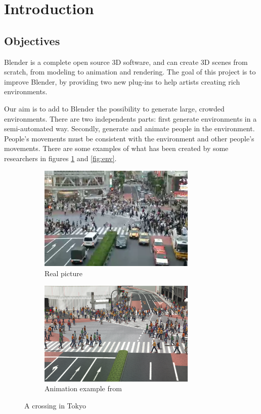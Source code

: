 \section{Introduction}

\subsection{Objectives}

Blender is a complete open source 3D software, and can create 3D scenes from
scratch, from modeling to animation and rendering. The goal of this
project is to improve Blender, by
providing two new plug-ins to help artists creating rich environments.

Our aim is to add to Blender the possibility to generate large,
crowded environments. There are two independents parts: first
generate environments in a semi-automated way. Secondly, generate and
animate people in the environment. People's movements must be consistent
with the environment and other people's movements. There are some
examples of what has been created by some researchers in figures
\ref{fig:crowd} and \ref{fig:env}.

\begin{figure}[h] \centering

  \begin{subfigure}[t]{0.5\textwidth}
    \includegraphics[width=7.5cm]{img/PLE_real.png}
    \caption{Real picture}
  \end{subfigure}%
  \begin{subfigure}[t]{0.5\textwidth}
    \includegraphics[width=7.5cm]{img/PLE_simu.png}
    \caption{Animation example from \cite{PLE}}
  \end{subfigure}
  \caption{A crossing in Tokyo}
  \label{fig:crowd}
\end{figure}

